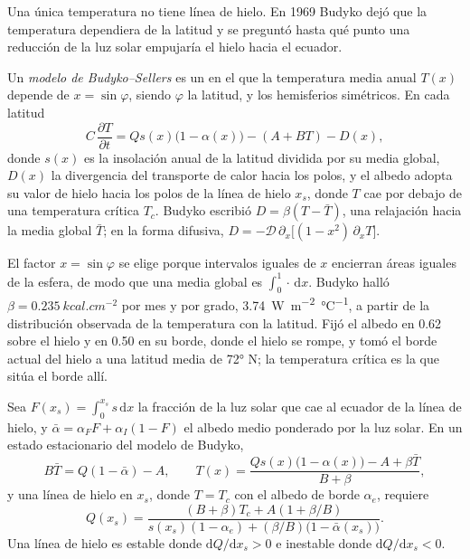 Una única temperatura no tiene línea de hielo. En 1969 Budyko dejó que la temperatura
dependiera de la latitud y se preguntó hasta qué punto una reducción de la luz solar empujaría
el hielo hacia el ecuador.

\begin{definition}\label{def:b3:climate-models:budyko-sellers}
Un \emph{modelo de Budyko--Sellers} es un
 en el que la temperatura media anual $T(x)$ depende de
$x = \sin\varphi$, siendo $\varphi$ la latitud, y los hemisferios simétricos.
En cada latitud
\[
C\,\frac{\partial T}{\partial t} = Qs(x)\big(1 - \alpha(x)\big) - (A + BT) - D(x) ,
\]
donde $s(x)$ es la insolación anual de la latitud dividida por su media
global, $D(x)$ la divergencia del transporte de calor hacia los polos, y el albedo
adopta su valor de hielo hacia los polos de la línea de hielo $x_s$, donde $T$ cae por debajo de una
temperatura crítica $T_c$. Budyko escribió $D = \beta(T - \bar T)$, una
relajación hacia la media global $\bar T$; en la forma difusiva, $D =
-\mathcal D\,\partial_x\big[(1 - x^2)\,\partial_xT\big]$.
\end{definition}

El factor $x = \sin\varphi$ se elige porque intervalos iguales de $x$ encierran
áreas iguales de la esfera, de modo que una media global es $\int_0^1\cdot\,\mathrm
dx$. Budyko halló $\beta = \qty{0.235}{kcal.cm^{-2}}$ por mes y por
grado, \qty{3.74}{W.m^{-2}.\celsius^{-1}}, a partir de la distribución observada
de la temperatura con la latitud. Fijó el albedo en 0.62 sobre el hielo y en 0.50 en su borde,
donde el hielo se rompe, y tomó el borde actual del hielo a una latitud media
de \ang{72} N; la temperatura crítica es la que sitúa el borde
allí.

\begin{proposition}\label{prop:b3:climate-models:iceline}
Sea $F(x_s) = \int_0^{x_s}s\,\mathrm dx$ la fracción de la luz solar que
cae al ecuador de la línea de hielo, y $\bar\alpha = \alpha_FF + \alpha_I(1 -
F)$ el albedo medio ponderado por la luz solar. En un estado estacionario del
modelo de Budyko,
\[
B\bar T = Q(1 - \bar\alpha) - A, \qquad
T(x) = \frac{Qs(x)\big(1 - \alpha(x)\big) - A + \beta\bar T}{B + \beta} ,
\]
y una línea de hielo en $x_s$, donde $T = T_c$ con el albedo de borde $\alpha_e$,
requiere
\[
Q(x_s) = \frac{(B + \beta)T_c + A(1 + \beta/B)}{s(x_s)(1 - \alpha_e) +
(\beta/B)\big(1 - \bar\alpha(x_s)\big)} .
\]
Una línea de hielo es estable donde $\mathrm dQ/\mathrm dx_s > 0$ e
inestable donde $\mathrm dQ/\mathrm dx_s < 0$.
\end{proposition}

